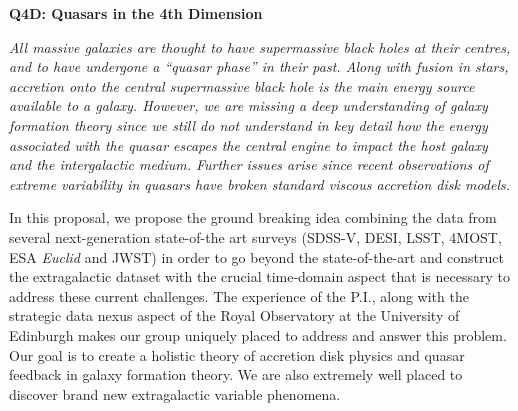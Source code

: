 \documentclass[oneside, a4paper, onecolumn, 11pt]{article}
\begin{document}
\begin{center}
{\Large \bf \textcolor{Cerulean}{Q4D: Quasars in the 4th Dimension\\}}
\end{center}
\vspace{-16pt} 

\tableofcontents

\medskip \medskip
\noindent
{\it 
All massive galaxies are thought to have supermassive black holes at
their centres, and to have undergone a ``quasar phase'' in
their past. Along with fusion in stars, accretion onto the central
supermassive black hole is the main energy source available to a
galaxy. However, we are missing a deep understanding of galaxy
formation theory since we still do not understand in key detail how
the energy associated with the quasar escapes the central engine to impact the host galaxy and
the intergalactic medium. Further issues arise since recent
observations of extreme variability in quasars have broken standard
viscous accretion disk models.

\smallskip
\smallskip
\noindent
In this proposal, we propose the ground breaking idea combining the
data from several next-generation state-of-the art surveys (SDSS-V,
DESI, LSST, 4MOST, ESA {\it Euclid} and JWST) in order to go beyond
the state-of-the-art and construct the extragalactic dataset with the
crucial time-domain aspect that is necessary to address these current
challenges.  The experience of the P.I., along with the strategic
data nexus aspect of the Royal Observatory at the University of
Edinburgh makes our group uniquely placed to address and answer this
problem.  Our goal is to create a holistic theory of accretion disk
physics and quasar feedback in galaxy formation theory. We are also
extremely well placed to discover brand new extragalactic variable
phenomena.
}
\vspace{-20pt}











\newpage
\fancyhf{}
\setcounter{page}{1}

%


\end{document}
